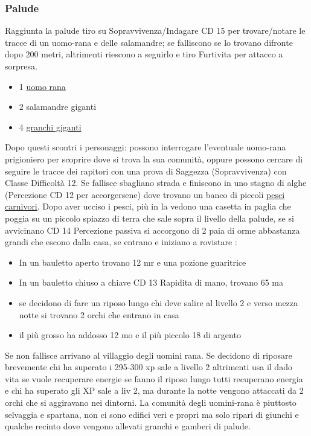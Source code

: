 \documentclass{article}
\begin{document}
            \subsubsection{Palude} Raggiunta la palude tiro su Sopravvivenza/Indagare CD 15 per trovare/notare le tracce di un uomo-rana e delle salamandre; se falliscono se lo trovano difronte dopo 200 metri, altrimenti riescono a seguirlo e tiro Furtivita per attacco a sorpresa. 
\begin{itemize}
    \item 1 \hyperlink{uomorana}{uomo rana}
    \item 2 salamandre giganti
    \item 4 \hyperlink{granchio}{granchi giganti}
\end{itemize}




Dopo questi scontri i personaggi: possono interrogare l’eventuale uomo-rana prigioniero per scoprire dove si trova la sua comunità, oppure possono cercare di seguire le tracce dei rapitori con una prova di Saggezza (Sopravvivenza) con Classe Difficoltà 12.
Se fallisce sbagliano strada e finiscono in uno stagno di alghe (Percezione CD 12 per accorgersene) dove trovano un banco di piccoli \hyperlink{sciame}{pesci carnivori}. Dopo aver ucciso i pesci, più in la vedono una casetta in paglia che poggia su un piccolo spiazzo di terra che sale sopra il livello della palude, se si avvicinano CD 14 Percezione passiva si accorgono di 2 paia di orme abbastanza grandi che escono dalla casa, se entrano e iniziano a rovistare :
\begin{itemize}
    \item In un bauletto aperto trovano 12 mr e una pozione guaritrice
    \item In un bauletto chiuso a chiave CD 13 Rapidita di mano, trovano 65 ma
\end{itemize}
\begin{itemize}
    \item se decidono di fare un riposo lungo chi deve salire al livello 2 e verso mezza notte si trovano 2 orchi che entrano in casa
    \item il più grosso ha addosso 12 mo e il più piccolo 18 di argento
\end{itemize}
Se non fallisce arrivano al villaggio degli uomini rana. Se decidono di riposare brevemente chi ha superato i 295-300 xp sale a livello 2 altrimenti usa il dado vita se vuole recuperare energie se fanno il riposo lungo tutti recuperano energia e chi ha superato gli XP sale a liv 2, ma durante la notte vengono attaccati da 2 orchi che si aggiravano nei dintorni.
La comunità degli uomini-rana è piuttosto selvaggia e spartana, non ci sono edifici veri e propri ma solo ripari di giunchi e qualche recinto dove vengono allevati granchi e gamberi di palude.
\end{document}
